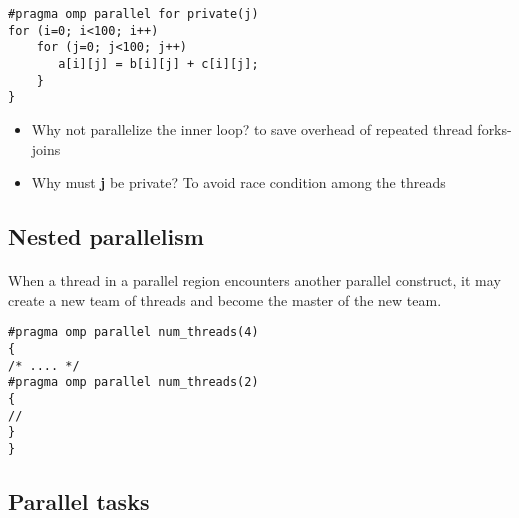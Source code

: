 \documentclass[%
oneside,                 %
final,                   %
10pt]{article}
\begin{document}
\noindent







\begin{verbatim}
#pragma omp parallel for private(j)
for (i=0; i<100; i++)
    for (j=0; j<100; j++)
       a[i][j] = b[i][j] + c[i][j];
    }
}

\end{verbatim}


\begin{itemize}
\item Why not parallelize the inner loop? to save overhead of repeated thread forks-joins

\item Why must \textbf{j} be private? To avoid race condition among the threads
\end{itemize}

\noindent



\subsection*{Nested parallelism}

\paragraph{}
When a thread in a parallel region encounters another parallel construct, it
may create a new team of threads and become the master of the new
team.









\begin{verbatim}
#pragma omp parallel num_threads(4)
{
/* .... */
#pragma omp parallel num_threads(2)
{
//  
}
}

\end{verbatim}



\subsection*{Parallel tasks}
\end{document}

